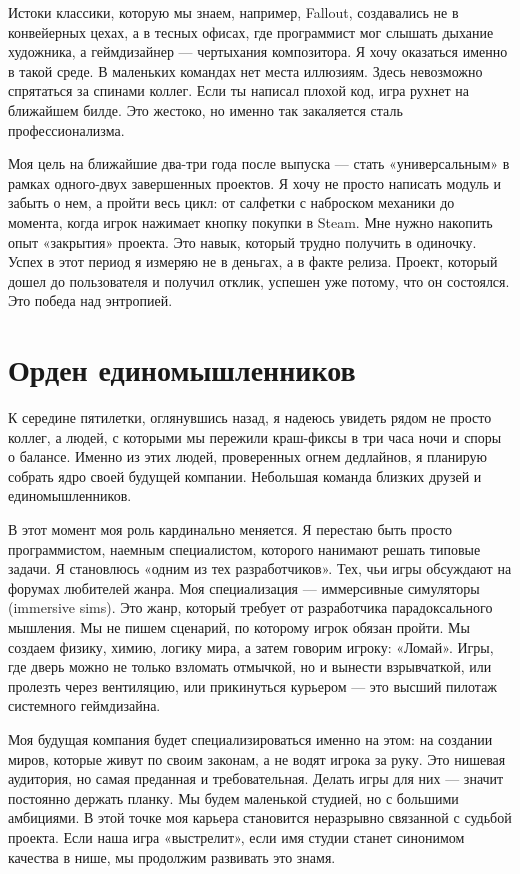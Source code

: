 \documentclass[14pt,a4paper]{extarticle}
\begin{document}
Истоки классики, которую мы знаем, например, Fallout, создавались не в
конвейерных цехах, а в тесных офисах, где программист мог слышать дыхание
художника, а геймдизайнер — чертыхания композитора. Я хочу оказаться именно в
такой среде. В маленьких командах нет места иллюзиям. Здесь невозможно
спрятаться за спинами коллег. Если ты написал плохой код, игра рухнет на
ближайшем билде. Это жестоко, но именно так закаляется сталь профессионализма.

Моя цель на ближайшие два-три года после выпуска — стать «универсальным» в
рамках одного-двух завершенных проектов. Я хочу не просто написать модуль и
забыть о нем, а пройти весь цикл: от салфетки с наброском механики до момента,
когда игрок нажимает кнопку покупки в Steam. Мне нужно накопить опыт «закрытия»
проекта. Это навык, который трудно получить в одиночку. Успех в этот период я
измеряю не в деньгах, а в факте релиза. Проект, который дошел до пользователя и
получил отклик, успешен уже потому, что он состоялся. Это победа над энтропией.

\section{ Орден единомышленников }

К середине пятилетки, оглянувшись назад, я надеюсь увидеть рядом не просто
коллег, а людей, с которыми мы пережили краш-фиксы в три часа ночи и споры о
балансе. Именно из этих людей, проверенных огнем дедлайнов, я планирую собрать
ядро своей будущей компании. Небольшая команда близких друзей и
единомышленников.

В этот момент моя роль кардинально меняется. Я перестаю быть просто
программистом, наемным специалистом, которого нанимают решать типовые задачи. Я
становлюсь «одним из тех разработчиков». Тех, чьи игры обсуждают на форумах
любителей жанра. Моя специализация — иммерсивные симуляторы (immersive sims).
Это жанр, который требует от разработчика парадоксального мышления. Мы не пишем
сценарий, по которому игрок обязан пройти. Мы создаем физику, химию, логику
мира, а затем говорим игроку: «Ломай». Игры, где дверь можно не только взломать
отмычкой, но и вынести взрывчаткой, или пролезть через вентиляцию, или
прикинуться курьером — это высший пилотаж системного геймдизайна.

Моя будущая компания будет специализироваться именно на этом: на создании
миров, которые живут по своим законам, а не водят игрока за руку. Это нишевая
аудитория, но самая преданная и требовательная. Делать игры для них — значит
постоянно держать планку. Мы будем маленькой студией, но с большими амбициями.
В этой точке моя карьера становится неразрывно связанной с судьбой проекта.
Если наша игра «выстрелит», если имя студии станет синонимом качества в нише,
мы продолжим развивать это знамя.
\end{document}
